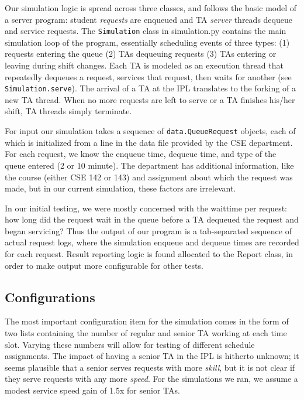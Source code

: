 \documentclass{article}
\begin{document}
\begin{multicols}{2}
Our simulation logic is spread across three classes, and follows the basic model of a server program: student \textit{requests} are enqueued and TA \textit{server} threads dequeue and service requests. The \texttt{Simulation} class in {simulation.py} contains the main simulation loop of the program, essentially scheduling events of three types: (1) requests entering the queue (2) TAs dequeuing requests (3) TAs entering or leaving during shift changes. Each TA is modeled as an execution thread that repeatedly dequeues a request, services that request, then waits for another (see \texttt{Simulation.serve}). The arrival of a TA at the IPL translates to the forking of a new TA thread. When no more requests are left to serve or a TA finishes his/her shift, TA threads simply terminate.

For input our simulation takes a sequence of \texttt{data.QueueRequest} objects, each of which is initialized from a line in the data file provided by the CSE department. For each request, we know the enqueue time, dequeue time, and type of the queue entered (2 or 10 minute). The department has additional information, like the course (either CSE 142 or 143) and assignment about which the request was made, but in our current simulation, these factors are irrelevant.

In our initial testing, we were mostly concerned with the waittime per request: how long did the request wait in the queue before a TA dequeued the request and began servicing? Thus the output of our program is a tab-separated sequence of actual request logs, where the simulation enqueue and dequeue times are recorded for each request. Result reporting logic is found allocated to the {Report} class, in order to make output more configurable for other tests.

\subsection*{Configurations}

The most important configuration item for the simulation comes in the form of two lists containing the number of regular and senior TA working at each time slot. Varying these numbers will allow for testing of different schedule assignments. The impact of having a senior TA in the IPL is hitherto unknown; it seems plausible that a senior serves requests with more \textit{skill}, but it is not clear if they serve requests with any more \textit{speed}. For the simulations we ran, we assume a modest service speed gain of 1.5x for senior TAs.


\end{multicols}
\end{document}

